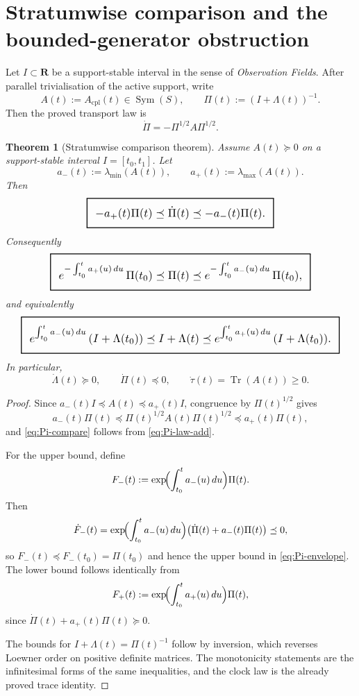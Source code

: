 \documentclass[11pt,a4paper]{article}
\numberwithin{equation}{section}
\DeclareMathOperator{\Tr}{Tr}
\DeclareMathOperator{\Sym}{Sym}
\newcommand{\R}{\mathbf R}
\newcommand{\geomboxed}[1]{%
  \setlength{\fboxsep}{8pt}%
  \setlength{\fboxrule}{0.9pt}%
  \fbox{\scalebox{1.18}{$\displaystyle #1$}}%
}
\theoremstyle{thmcompact}
\newtheorem{theorem}{Theorem}[section]
\theoremstyle{remark}
\begin{document}
\section{Stratumwise comparison and the bounded-generator obstruction}

Let $I\subset \R$ be a support-stable interval in the sense of \emph{Observation Fields}. After parallel trivialisation of the active support, write
\[
A(t):=A_{\mathrm{cpl}}(t)\in \Sym(S),
\qquad
\Pi(t):=(I+\Lambda(t))^{-1}.
\]
Then the proved transport law is
\begin{equation}
\dot\Pi=-\Pi^{1/2}A\Pi^{1/2}.
\label{eq:Pi-law-add}
\end{equation}

\begin{theorem}[Stratumwise comparison theorem]
\label{thm:comparison}
Assume $A(t)\succeq 0$ on a support-stable interval $I=[t_0,t_1]$. Let
\[
a_-(t):=\lambda_{\min}(A(t)),
\qquad
a_+(t):=\lambda_{\max}(A(t)).
\]
Then
\begin{equation}
\geomboxed{
-a_+(t)\Pi(t)\preceq \dot\Pi(t)\preceq -a_-(t)\Pi(t).
}
\label{eq:Pi-compare}
\end{equation}
Consequently
\begin{equation}
\geomboxed{
e^{-\int_{t_0}^t a_+(u)\,du}\,\Pi(t_0)
\preceq
\Pi(t)
\preceq
e^{-\int_{t_0}^t a_-(u)\,du}\,\Pi(t_0),
}
\label{eq:Pi-envelope}
\end{equation}
and equivalently
\begin{equation}
\geomboxed{
e^{\int_{t_0}^t a_-(u)\,du}\,(I+\Lambda(t_0))
\preceq
I+\Lambda(t)
\preceq
e^{\int_{t_0}^t a_+(u)\,du}\,(I+\Lambda(t_0)).
}
\label{eq:Lambda-envelope}
\end{equation}
In particular,
\[
\dot\Lambda(t)\succeq 0,
\qquad
\dot\Pi(t)\preceq 0,
\qquad
\dot\tau(t)=\Tr(A(t))\ge 0.
\]
\end{theorem}

\begin{proof}
Since $a_-(t)I\preceq A(t)\preceq a_+(t)I$, congruence by $\Pi(t)^{1/2}$ gives
\[
a_-(t)\Pi(t)\preceq \Pi(t)^{1/2}A(t)\Pi(t)^{1/2}\preceq a_+(t)\Pi(t),
\]
and \eqref{eq:Pi-compare} follows from \eqref{eq:Pi-law-add}.

For the upper bound, define
\[
F_-(t):=\exp\!\Bigl(\int_{t_0}^t a_-(u)\,du\Bigr)\Pi(t).
\]
Then
\[
\dot F_-(t)
=
\exp\!\Bigl(\int_{t_0}^t a_-(u)\,du\Bigr)\bigl(\dot\Pi(t)+a_-(t)\Pi(t)\bigr)
\preceq 0,
\]
so $F_-(t)\preceq F_-(t_0)=\Pi(t_0)$ and hence the upper bound in \eqref{eq:Pi-envelope}. The lower bound follows identically from
\[
F_+(t):=\exp\!\Bigl(\int_{t_0}^t a_+(u)\,du\Bigr)\Pi(t),
\]
since $\dot\Pi(t)+a_+(t)\Pi(t)\succeq 0$.

The bounds for $I+\Lambda(t)=\Pi(t)^{-1}$ follow by inversion, which reverses Loewner order on positive definite matrices. The monotonicity statements are the infinitesimal forms of the same inequalities, and the clock law is the already proved trace identity.
\end{proof}
\end{document}
